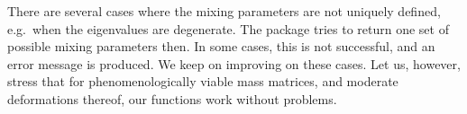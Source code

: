 \documentclass[12pt,a4paper,twoside]{scrartcl}
\newcommand{\function}[1]{{\tt #1}}
\def\I{\mathrm{i}}
\numberwithin{equation}{section}
\numberwithin{table}{section}
\begin{document}
There are several cases where the mixing parameters are not uniquely defined,
e.g.\ when the eigenvalues are degenerate. The package tries to return one set
of possible mixing parameters then.  In some cases, this is not successful, and
an error message is produced. We keep on improving on these cases. Let us,
however, stress that for phenomenologically viable mass matrices, and moderate
deformations thereof, our functions work without problems.
% 
% 
% 
% 
\end{document}
